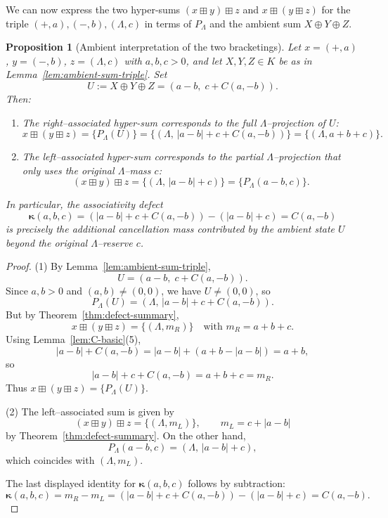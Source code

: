 \documentclass[11pt]{amsart}
\numberwithin{equation}{section}
\newtheorem{proposition}[theorem]{Proposition}
\theoremstyle{definition}
\theoremstyle{remark}
\newcommand{\AssocCurv}{\boldsymbol{\kappa}} %
\newcommand{\Kamb}{K}                      %
\newcommand{\op}{\boxplus}                 %
\newcommand{\Cfun}{C}                      %
\begin{document}
We can now express the two hyper-sums $(x\op y)\op z$ and
$x\op(y\op z)$ for the triple $(+,a),(-,b),(\Lambda,c)$ in terms of
$P_\Lambda$ and the ambient sum $X\oplus Y\oplus Z$.

\begin{proposition}[Ambient interpretation of the two bracketings]
\label{prop:ambient-two-bracketings}
Let $x=(+,a)$, $y=(-,b)$, $z=(\Lambda,c)$ with $a,b,c>0$, and let
$X,Y,Z\in\Kamb$ be as in Lemma~\ref{lem:ambient-sum-triple}.  Set
\[
  U := X\oplus Y\oplus Z
  = (a-b,\; c+\Cfun(a,-b)).
\]
Then:
\begin{enumerate}
  \item The right--associated hyper-sum corresponds to the full
        $\Lambda$--projection of $U$:
  \[
    x\op(y\op z) = \{P_\Lambda(U)\}
    = \{(\Lambda,\,|a-b|+c+\Cfun(a,-b))\}
    = \{(\Lambda,a+b+c)\}.
  \]
  \item The left--associated hyper-sum corresponds to the partial
        $\Lambda$--projection that only uses the original $\Lambda$--mass
        $c$:
  \[
    (x\op y)\op z
    = \{(\Lambda,\,|a-b|+c)\}
    = \{P_\Lambda(a-b,c)\}.
  \]
\end{enumerate}
In particular, the associativity defect
\[
  \AssocCurv(a,b,c)
  = (|a-b|+c+\Cfun(a,-b)) - (|a-b|+c)
  = \Cfun(a,-b)
\]
is precisely the additional cancellation mass contributed by the
ambient state $U$ beyond the original $\Lambda$--reserve $c$.
\end{proposition}

\begin{proof}
(1) By Lemma~\ref{lem:ambient-sum-triple},
\[
  U = (a-b,\; c+\Cfun(a,-b)).
\]
Since $a,b>0$ and $(a,b)\ne(0,0)$, we have $U\ne(0,0)$, so
\[
  P_\Lambda(U)
  = (\Lambda,\,|a-b|+c+\Cfun(a,-b)).
\]
But by Theorem~\ref{thm:defect-summary},
\[
  x\op(y\op z) = \{(\Lambda,m_R)\}
  \quad\text{with }m_R=a+b+c.
\]
Using Lemma~\ref{lem:C-basic}(5),
\[
  |a-b|+\Cfun(a,-b)
  = |a-b| + (a+b-|a-b|)
  = a+b,
\]
so
\[
  |a-b|+c+\Cfun(a,-b) = a+b+c = m_R.
\]
Thus $x\op(y\op z)=\{P_\Lambda(U)\}$.

(2) The left--associated sum is given by
\[
  (x\op y)\op z = \{(\Lambda,m_L)\},\qquad m_L=c+|a-b|
\]
by Theorem~\ref{thm:defect-summary}.  On the other hand,
\[
  P_\Lambda(a-b,c)
  = (\Lambda,\,|a-b|+c),
\]
which coincides with $(\Lambda,m_L)$.

The last displayed identity for $\AssocCurv(a,b,c)$ follows by subtraction:
\[
  \AssocCurv(a,b,c)
  = m_R-m_L
  = (|a-b|+c+\Cfun(a,-b)) - (|a-b|+c)
  = \Cfun(a,-b).
\]
\end{proof}
\end{document}
